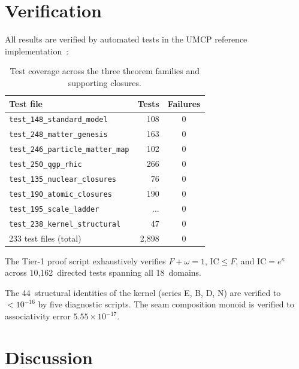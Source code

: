 \documentclass[
  aps,
  prd,
  twocolumn,
  superscriptaddress,
  nofootinbib,
  floatfix
]{revtex4-2}
\newcommand{\IC}{\mathrm{IC}}
\begin{document}
\section{Verification}\label{sec:verification}

All results are verified by automated tests in the
UMCP reference implementation~\cite{umcpmetadatarepo}:

\begin{table}[h]
\caption{\label{tab:tests}Test coverage across the three
theorem families and supporting closures.}
\begin{ruledtabular}
\begin{tabular}{lrc}
Test file & Tests & Failures \\
\hline
\texttt{test\_148\_standard\_model} & 108 & 0 \\
\texttt{test\_248\_matter\_genesis} & 163 & 0 \\
\texttt{test\_246\_particle\_matter\_map} & 102 & 0 \\
\texttt{test\_250\_qgp\_rhic} & 266 & 0 \\
\texttt{test\_135\_nuclear\_closures} & 76 & 0 \\
\texttt{test\_190\_atomic\_closures} & 190 & 0 \\
\texttt{test\_195\_scale\_ladder} & ... & 0 \\
\texttt{test\_238\_kernel\_structural} & 47 & 0 \\
233 test files (total) & 2{,}898 & 0 \\
\end{tabular}
\end{ruledtabular}
\end{table}

The Tier-1 proof script exhaustively verifies
$F + \omega = 1$, $\IC \leq F$, and $\IC = e^{\kappa}$
across 10{,}162~directed tests spanning all 18~domains.

The 44~structural identities of the kernel (series E, B, D, N)
are verified to $< 10^{-16}$ by five diagnostic scripts.
The seam composition monoid is verified to associativity error
$5.55 \times 10^{-17}$.

\section{Discussion}\label{sec:discussion}
\end{document}
